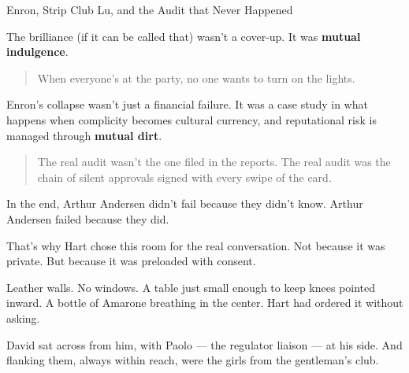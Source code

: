 \begin{HistoricalSidebar}{Enron, Strip Club Lu, and the Audit that Never Happened}
  \medskip
  
  The brilliance (if it can be called that) wasn’t a cover-up. It was \textbf{mutual indulgence}.  
  
  \begin{quote}
  When everyone’s at the party, no one wants to turn on the lights.
  \end{quote}
  
  Enron’s collapse wasn’t just a financial failure. It was a case study in what happens when complicity becomes 
  cultural currency, and reputational risk is managed through \textbf{mutual dirt}.  
  
  \begin{quote}
  The real audit wasn’t the one filed in the reports.  
  The real audit was the chain of silent approvals signed with every swipe of the card.
  \end{quote}
  
  In the end, Arthur Andersen didn’t fail because they didn’t know.  Arthur Andersen failed because they did.
  
\end{HistoricalSidebar}

\medskip

That’s why Hart chose this room for the real conversation.  
Not because it was private.  
But because it was preloaded with consent.

Leather walls. No windows. A table just small enough to keep knees pointed inward.  
A bottle of Amarone breathing in the center. Hart had ordered it without asking.

David sat across from him, with Paolo — the regulator liaison — at his side.  
And flanking them, always within reach, were the girls from the gentleman's club.

\medskip


